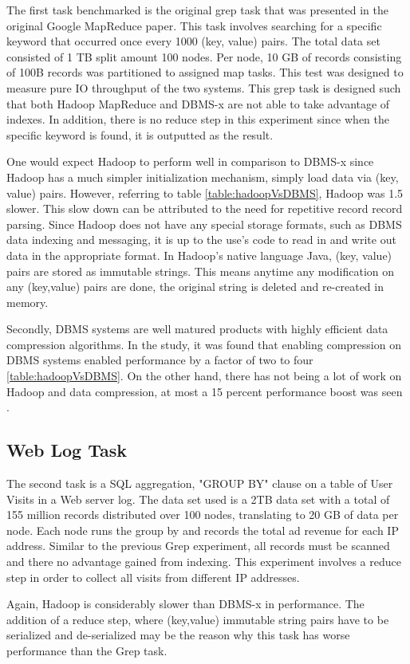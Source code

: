 \documentclass[10pt,twocolumn]{IEEEtran11}
\begin{document}
The first task benchmarked is the original grep task that was presented in the original Google MapReduce paper.  This task involves searching for a specific keyword that occurred once every 1000 (key, value) pairs.   The total data set consisted of 1 TB split amount 100 nodes.  Per node, 10 GB of records consisting of 100B records was partitioned to assigned map tasks.  This test was designed to measure pure IO throughput of the two systems.  This grep task is designed such that both Hadoop MapReduce and DBMS-x are not able to take advantage of indexes.  In addition, there is no reduce step in this experiment since when the specific keyword is found, it is outputted as the result.
\par
One would expect Hadoop to perform well in comparison to DBMS-x since Hadoop has a much simpler initialization mechanism, simply load data via (key, value) pairs.  However, referring to table \ref{table:hadoopVsDBMS}, Hadoop was 1.5 slower.  This slow down can be attributed to the need for repetitive record record parsing.  Since Hadoop does not have any special storage formats, such as DBMS data indexing and messaging, it is up to the use's code to  read in and write out data in the appropriate format.  In Hadoop's native language Java, (key, value) pairs are stored as immutable strings.  This means anytime any modification on any (key,value) pairs are done, the original string is deleted and re-created in memory.
\par
Secondly, DBMS systems are well matured products with highly efficient data compression algorithms.  In the study, it was found that enabling compression on DBMS systems enabled performance by a factor of two to four \ref{table:hadoopVsDBMS}.  On the other hand, there has not being a lot of work on Hadoop and data compression, at most a 15 percent performance boost was seen \cite{dean2001mapreduce}.

\subsection{Web Log Task}
The second task is a SQL aggregation, "GROUP BY" clause on a table of User Visits in a Web server log.  The data set used is a 2TB data set with a total of 155 million records distributed over 100 nodes, translating to 20 GB of data per node.  Each node runs the group by and records the total ad revenue for each IP address.  Similar to the previous Grep experiment, all records must be scanned and there no advantage gained from indexing.  This experiment involves a reduce step in order to collect all visits from different IP addresses.
\par
Again, Hadoop is considerably slower than DBMS-x in performance.  The addition of a reduce step, where (key,value) immutable string pairs have to be serialized and de-serialized may be the reason why this task has worse performance than the Grep task.
\end{document}
